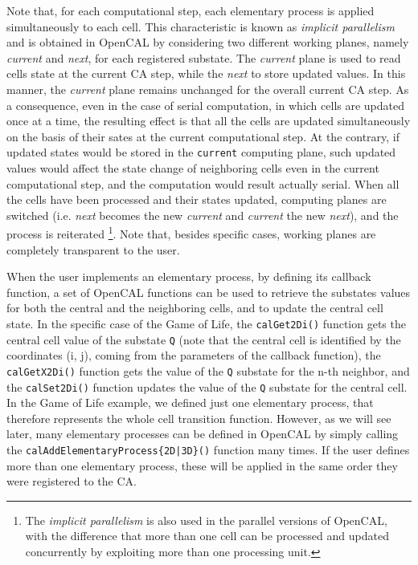 Note that, for each computational step, each elementary process is
applied simultaneously to each cell. This characteristic is known as
\emph{implicit parallelism} and is obtained in OpenCAL by considering
two different working planes, namely \emph{current} and \emph{next},
for each registered substate. The \emph{current} plane is used to read
cells state at the current CA step, while the \emph{next} to store
updated values. In this manner, the \emph{current} plane remains
unchanged for the overall current CA step. As a consequence, even in
the case of serial computation, in which cells are updated once at a
time, the resulting effect is that all the cells are updated
simultaneously on the basis of their sates at the current
computational step. At the contrary, if updated states would be stored
in the \verb'current' computing plane, such updated values would
affect the state change of neighboring cells even in the current
computational step, and the computation would result actually
serial. When all the cells have been processed and their states
updated, computing planes are switched (i.e. \emph{next} becomes the
new \emph{current} and \emph{current} the new \emph{next}), and the
process is reiterated \footnote{The \emph{implicit parallelism} is
  also used in the parallel versions of OpenCAL, with the difference
  that more than one cell can be processed and updated concurrently by
  exploiting more than one processing unit.}. Note that, besides
specific cases, working planes are completely transparent to the user.

When the user implements an elementary process, by defining its
callback function, a set of OpenCAL functions can be used to retrieve
the substates values for both the central and the neighboring cells,
and to update the central cell state. In the specific case of the Game
of Life, the \verb'calGet2Di()' function gets the central cell value
of the substate \verb'Q' (note that the central cell is identified by
the coordinates (i, j), coming from the parameters of the callback
function), the \verb'calGetX2Di()' function gets the value of the
\verb'Q' substate for the n-th neighbor, and the \verb'calSet2Di()'
function updates the value of the \verb'Q' substate for the
central cell. In the Game of Life example, we defined just one
elementary process, that therefore represents the whole cell
transition function. However, as we will see later, many elementary
processes can be defined in OpenCAL by simply calling the
\verb'calAddElementaryProcess{2D|3D}()' function many times. If the user
defines more than one elementary process, these will be applied in
the same order they were registered to the CA.

